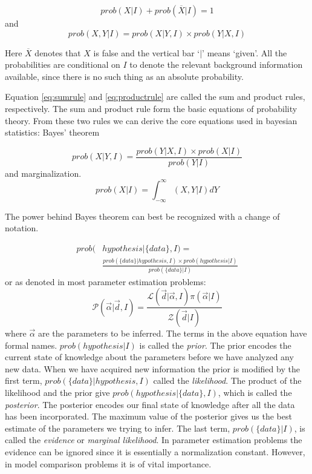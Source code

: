 \documentclass[12pt]{article}
\numberwithin{equation}{section}
\begin{document}
\cite{sivia2006data} 
\begin{equation} \label{eq:sumrule}
	prob(X|I) + prob(\overline{X}|I) = 1
\end{equation}
and 
\begin{equation} \label{eq:productrule}
	prob(X,Y|I) = prob(X|Y,I) \times prob(Y|X,I)
\end{equation}

Here $\overline{X}$ denotes that $X$ is false and the vertical bar `$|$' means `given'. All the probabilities are conditional on $I$ to denote the relevant background information available, since there is no such thing as an absolute probability. 

Equation \ref{eq:sumrule} and \ref{eq:productrule} are called the sum and product rules, respectively. The sum and product rule form the basic equations of probability theory. From these two rules we can derive the core equations used in bayesian statistics: Bayes' theorem

\begin{equation} \label{eq:bayes1}
	prob(X|Y,I) = \frac{prob(Y|X,I) \times prob(X|I)}{prob(Y|I)}
\end{equation}
and marginalization.
\begin{equation} \label{eq:marginalization}
	prob(X|I) = \int_{-\infty}^{\infty}{(X,Y|I)dY}
\end{equation}

The power behind Bayes theorem can best be recognized with a change of notation. 

\begin{align}\label{eq:bayes2}
	prob(&hypothesis|\{data\},I) =  \nonumber \\ 
	& \frac{prob(\{data\}|hypothesis,I) \times prob(hypothesis|I)}{prob(\{data\}|I)}
\end{align}
or as denoted in most parameter estimation problems:
\begin{equation} \label{eq:bayes3}
	\mathcal{P}(\vec{\alpha}|\vec{d},I) = \frac{\mathcal{L}(\vec{d}|\vec{\alpha},I)\pi(\vec{\alpha}|I)}{\mathcal{Z}(\vec{d}|I)}
\end{equation}
where $\vec{\alpha}$ are the parameters to be inferred.
The terms in the above equation have formal names. $prob(hypothesis|I)$ is called the \emph{prior}. The prior encodes the current state of knowledge about the parameters before we have analyzed any new data. When we have acquired new information the prior is modified by the first term, $prob(\{data\}|hypothesis,I)$ called the 
\emph{likelihood}. The product of the likelihood and the prior give $prob(hypothesis|\{data\},I)$, which is called the \emph{posterior}. The posterior encodes our final state of knowledge after all the data has been incorporated. The maximum value of the posterior gives us the best estimate of the parameters we trying to infer. The last term, $prob(\{data\}|I)$, is called the \emph{evidence} or \emph{marginal likelihood}. In parameter estimation problems the evidence can be ignored since it is essentially a normalization constant. However, in model comparison problems it is of vital importance.
\end{document}
